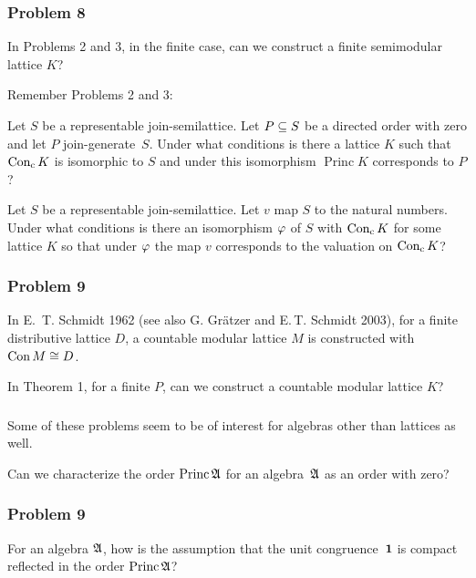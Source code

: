\documentclass[leqno]{beamer}
\DeclareMathOperator{\Princ}{Princ}
\DeclareMathOperator{\Conc}{\tup{Con}_\tup{c}}
\begin{document}
\begin{frame}
\frametitle{Problem 8}
\begin{problem}
In Problems 2 and 3, in the finite case, 
can we construct a finite semimodular lattice $K$?
\end{problem}

\pause

Remember Problems 2 and 3:

\begin{problem}
Let $S$ be a representable join-semilattice. 
Let $P \subseteq S$ be a directed order with zero 
and let $P$ join-generate~$S$.
Under what conditions is there a lattice $K$ such 
that $\Conc K$ is isomorphic to $S$
and under this isomorphism $\Princ K$ corresponds to $P$?
\end{problem}

\begin{problem}
Let $S$ be a representable join-semilattice. 
Let $v$ map $S$ to the natural numbers.
Under what conditions is there an isomorphism $\gf$
of $S$ with $\Conc K$ for some lattice $K$
so that under $\gf$ the map $v$ corresponds 
to the valuation on $\Conc K$?
\end{problem}
\end{frame}

\begin{frame}
\frametitle{Problem 9}
In E.~T. Schmidt 1962
(see also G. Gr\"atzer and E.\,T. Schmidt 2003),
for a finite distributive lattice $D$, 
a countable modular lattice $M$ is constructed
with $\operatorname{Con} M \cong D$.

\begin{problem}
In Theorem 1, for a finite $P$,
can we construct a countable modular lattice $K$?
\end{problem}
\end{frame}

\begin{frame}
\frametitle{}
Some of these problems seem to be of interest for algebras
other than lattices as well.

\begin{problem}
Can we characterize the order $\Princ \F A$ 
for an algebra~$\mathfrak{A}$
as an order with zero?
\end{problem}
\end{frame}

\begin{frame}
\frametitle{Problem 9}

\begin{problem}
For an algebra $\mathfrak{A}$,
how is the assumption that the unit congruence~$\mathbf{1}$
is compact reflected in  the order $\Princ \F A$? 
\end{problem}
\end{frame}
\end{document}
